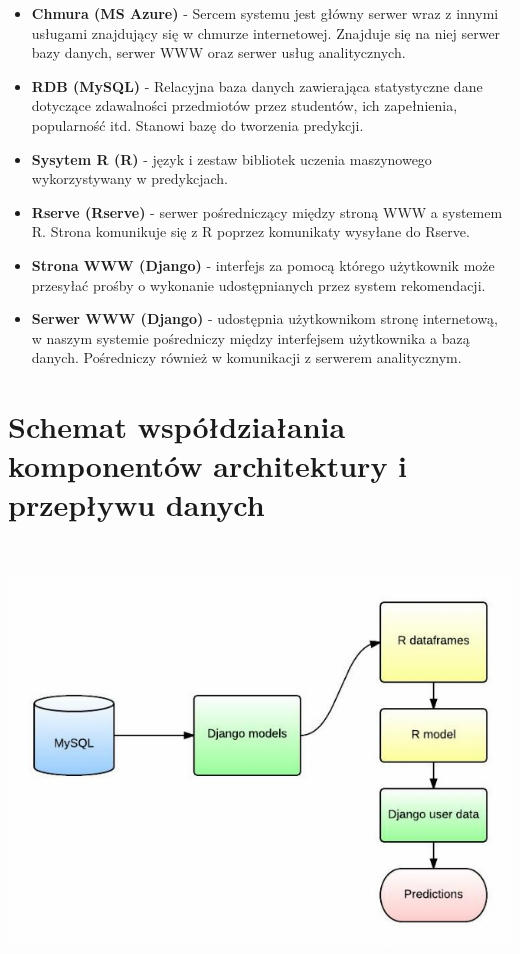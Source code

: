 \documentclass[licencjacka]{pracamgr}
\begin{document}
 \begin{itemize}
 
\item \textbf{Chmura (MS Azure)} - Sercem systemu jest główny serwer wraz z innymi usługami znajdujący się w chmurze internetowej. Znajduje się na niej serwer bazy danych, serwer WWW oraz serwer usług analitycznych.

\item \textbf {RDB (MySQL)} - Relacyjna baza danych zawierająca statystyczne dane dotyczące zdawalności przedmiotów przez studentów, ich zapełnienia, popularność itd. Stanowi bazę do tworzenia predykcji.

\item \textbf{Sysytem R (R)} - język i zestaw bibliotek uczenia maszynowego wykorzystywany w predykcjach.

\item \textbf{Rserve (Rserve)} - serwer pośredniczący między stroną WWW a systemem R. Strona komunikuje się z R
poprzez komunikaty wysyłane do Rserve.
 

\item \textbf{Strona WWW (Django)} - interfejs za pomocą którego użytkownik może przesyłać prośby o wykonanie udostępnianych przez system rekomendacji.

\item \textbf{Serwer WWW (Django)} - udostępnia użytkownikom stronę internetową, w naszym systemie pośredniczy między interfejsem użytkownika a bazą danych. Pośredniczy również w komunikacji z serwerem analitycznym.

  
\end{itemize}

\section{Schemat współdziałania komponentów architektury i przepływu danych}
~\\
\begin{minipage}{\linewidth} 
	\centering
           \includegraphics[scale = 0.7]{dataFlow.jpg}
\end{minipage} \\ \\ 
~\\ \indent
\end{document}
